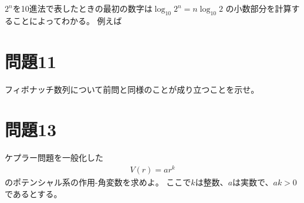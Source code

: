\documentclass{jsarticle}
\begin{document}
$2^{n}$を10進法で表したときの最初の数字は$\log_{10}{2^{n}}=n\log_{10}{2}$
の小数部分を計算することによってわかる。
例えば

\section*{問題11}
\begin{shaded}
フィボナッチ数列について前問と同様のことが成り立つことを示せ。
\end{shaded}
\section*{問題13}
\begin{shaded}
ケプラー問題を一般化した
\begin{align}
V(r)=ar^{k}
\end{align}
のポテンシャル系の作用-角変数を求めよ。
ここで$k$は整数、$a$は実数で、$ak>0$であるとする。
\end{shaded}
\end{document}
